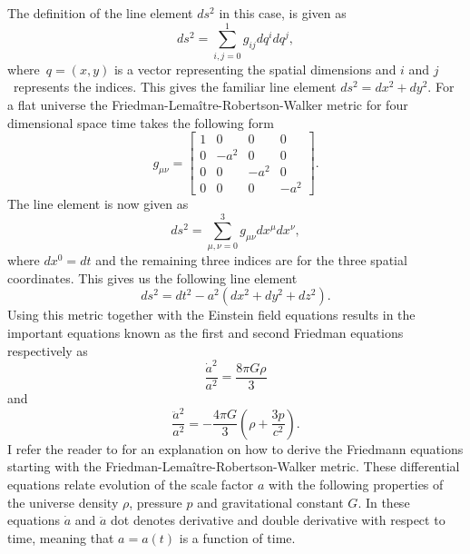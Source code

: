The definition of the line element $ds^2$ in this case, is given as
\begin{equation}
    ds^2 = \sum_{i,j=0}^1g_{ij}dq^idq^j,
\end{equation}
where $q=(x, y)$ is a vector representing the spatial dimensions and $i$ and $j$ represents the indices.
This gives the familiar line element $ds^2=dx^2+dy^2$.
For a flat universe the Friedman-Lemaître-Robertson-Walker metric for four dimensional space time takes the following form
\begin{equation}
    g_{\mu\nu}=
    \begin{bmatrix}
        1 & 0 & 0 & 0\\
        0 & -a^2 & 0 & 0\\
        0 & 0 & -a^2 & 0\\
        0 & 0 & 0 & -a^2 
    \end{bmatrix}.
\end{equation}
The line element is now given as 
\begin{equation}
    ds^2 = \sum_{\mu,\nu=0}^3g_{\mu\nu}dx^\mu dx^\nu,
\end{equation}
where $dx^0=dt$ and the remaining three indices are for the three spatial coordinates.
This gives us the following line element
\begin{equation}
    ds^2 = dt^2 -a^2(dx^2 + dy^2 + dz^2).
\end{equation}
Using this metric together with the Einstein field equations results in the important
equations known as the first and second Friedman equations respectively as
\begin{equation}\label{eq:F1}
    \frac{\dot{a}^2}{a^2} = \frac{8\pi G\rho}{3}
\end{equation}
and
\begin{equation}\label{eq:FII}
    \frac{\ddot{a}^2}{a^2} = -\frac{4\pi G}{3}(\rho + \frac{3p}{c^2}).
\end{equation}
I refer the reader to \cite[ch. 2]{Dodelson:1282338} for an explanation on how to derive the Friedmann equations starting with the Friedman-Lemaître-Robertson-Walker metric.
These differential equations relate evolution of the scale factor $a$ with the
following properties of the universe density $\rho$, pressure $p$ and gravitational
constant $G$. In these equations $\dot{a}$ and $\ddot{a}$ dot denotes
derivative and double derivative with respect to time, meaning that $a=a(t)$ is a
function of time. \\


